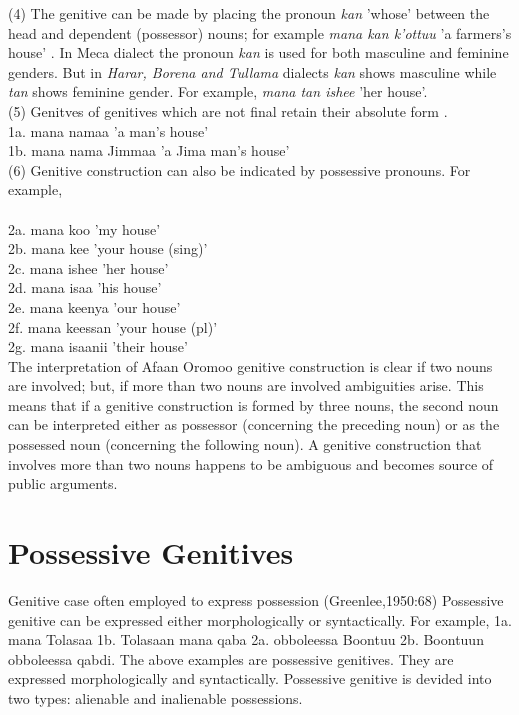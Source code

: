 \documentclass[11pt,a4paper]{article}
\begin{document}
	(4) The genitive can be made by placing the pronoun \emph{kan} 'whose' between the head and dependent (possessor) nouns; for example \emph{mana kan k'ottuu} 'a farmers's house' \cite[183]{gragg1976oromo}. In Meca dialect the pronoun \emph{kan} is used for both masculine and feminine genders. But in \emph{Harar, Borena and Tullama} dialects \emph{kan} shows masculine while \emph{tan} shows feminine gender. For example, \emph{mana tan ishee} 'her house'. \\
	
	(5) Genitves of genitives which are not final retain their absolute form \cite[104]{owens1985grammar}. \\
	
	1a. mana namaa 'a man's house'\\
	1b. mana nama Jimmaa 'a Jima man's house'\\
	
	(6) Genitive construction can also be indicated by possessive pronouns. For example,\\
	\\
	2a. mana koo 'my house'\\
	2b. mana kee 'your house (sing)'\\
	2c. mana ishee 'her house'\\
	2d. mana isaa 'his house'\\
	2e. mana keenya 'our house'\\
	2f. mana keessan 'your house (pl)'\\
	2g. mana isaanii 'their house'\\
	
	The interpretation of Afaan Oromoo genitive construction is clear if two nouns are involved; but, if more than two nouns are involved ambiguities arise. This means that if a genitive construction is 
	formed by three nouns, the second noun can be interpreted either as possessor (concerning the preceding noun) or as the possessed noun (concerning the
	following noun). A genitive construction that involves more than two nouns happens to be ambiguous and becomes source of public arguments. 
	
	
	
	\section{Possessive Genitives}
	
	Genitive case often employed to express possession (Greenlee,1950:68)
	Possessive genitive can be expressed either morphologically or syntactically. For example, 
	1a. mana Tolasaa
	1b. Tolasaan mana qaba
	2a. obboleessa Boontuu
	2b. Boontuun obboleessa qabdi.
	The above examples are possessive genitives. They are expressed morphologically and syntactically. 
	Possessive genitive is devided into two types: alienable and inalienable possessions.
	
\end{document}
